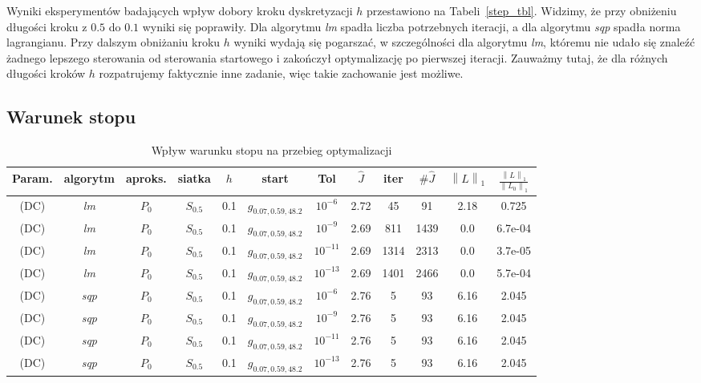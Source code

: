 \documentclass[licencjacka]{pracamgr}
\newcommand{\norm}[1]{\left\lVert#1\right\rVert}
\begin{document}
Wyniki eksperymentów badających wpływ dobory kroku dyskretyzacji $h$ przestawiono na Tabeli~\ref{step_tbl}. Widzimy, że przy obniżeniu długości kroku z $0.5$ do $0.1$ wyniki się poprawiły. Dla algorytmu {\it lm\/} spadła liczba potrzebnych iteracji, a dla algorytmu {\it sqp\/} spadła norma lagrangianu. Przy dalszym obniżaniu kroku $h$ wyniki wydają się pogarszać, w szczególności dla algorytmu {\it lm}, któremu nie udało się znaleźć żadnego lepszego sterowania od sterowania startowego i zakończył optymalizację po pierwszej iteracji. Zauważmy tutaj, że dla różnych długości kroków $h$ rozpatrujemy faktycznie inne zadanie, więc takie zachowanie jest możliwe.

\subsection{Warunek stopu}

\begin{table}[h]
  \begin{center}
    \begin{tabular}{|c|c|c|c|c|c|c||c|c|c|c|c|}
      \hline
      Param. & algorytm & aproks. & siatka & $h$ & start & Tol & $\hat{J}$ & iter & $\#\hat{J}$ & $\norm{L}_1$ & $\frac{\norm{L}_1}{\norm{L_0}_1}$ \\
      \hline
      (DC) & {\it lm\/} & $P_0$ & $S_{0.5}$ & 0.1 & $g_{0.07,0.59,48.2}$ & $10^{-6}$ & 2.72 & 45 & 91 & 2.18 & 0.725 \\
      \hline
      (DC) & {\it lm\/} & $P_0$ & $S_{0.5}$ & 0.1 & $g_{0.07,0.59,48.2}$ & $10^{-9}$ & 2.69 & 811 & 1439 & 0.0 & 6.7e-04 \\
      \hline
      (DC) & {\it lm\/} & $P_0$ & $S_{0.5}$ & 0.1 & $g_{0.07,0.59,48.2}$ & $10^{-11}$ & 2.69 & 1314 & 2313 & 0.0 & 3.7e-05 \\
      \hline
      (DC) & {\it lm\/} & $P_0$ & $S_{0.5}$ & 0.1 & $g_{0.07,0.59,48.2}$ & $10^{-13}$ & 2.69 & 1401 & 2466 & 0.0 & 5.7e-04 \\
      \hline
      (DC) & {\it sqp\/} & $P_0$ & $S_{0.5}$ & 0.1 & $g_{0.07,0.59,48.2}$ & $10^{-6}$ & 2.76 & 5 & 93 & 6.16 & 2.045 \\
      \hline
      (DC) & {\it sqp\/} & $P_0$ & $S_{0.5}$ & 0.1 & $g_{0.07,0.59,48.2}$ & $10^{-9}$ & 2.76 & 5 & 93 & 6.16 & 2.045 \\
      \hline
      (DC) & {\it sqp\/} & $P_0$ & $S_{0.5}$ & 0.1 & $g_{0.07,0.59,48.2}$ & $10^{-11}$ & 2.76 & 5 & 93 & 6.16 & 2.045 \\
      \hline
      (DC) & {\it sqp\/} & $P_0$ & $S_{0.5}$ & 0.1 & $g_{0.07,0.59,48.2}$ & $10^{-13}$ & 2.76 & 5 & 93 & 6.16 & 2.045 \\
      \hline
    \end{tabular}
    \caption{Wpływ warunku stopu na przebieg optymalizacji}\label{tol_tbl}
  \end{center}
\end{table}
\end{document}
